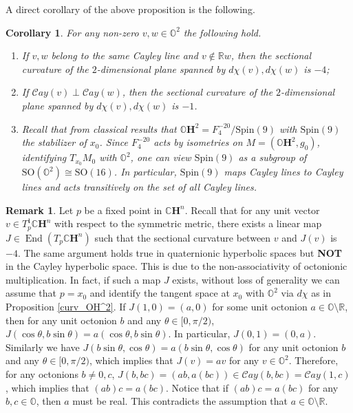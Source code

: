 \documentclass{article}
\newcommand{\isom}{\cong} %
\DeclareMathOperator{\End}{End}
\newcommand{\SO}{\mathrm{SO}}
\newcommand{\Spin}{\mathrm{Spin}}
\newcommand{\CC}{\mathbb{C}}
\newcommand{\OO}{\mathbb{O}}
\newcommand{\RR}{\mathbb{R}}
\newcommand{\Cay}{\mathcal{C}ay}
\newtheorem{cor}[thm]{Corollary}
\theoremstyle{definition}
\newtheorem*{rmk}{Remark}
\begin{document}
A direct corollary of the above proposition is the following.
\begin{cor}\label{curv_data_OH^2}
For any non-zero $v,w\in \OO^2$ the following hold.
\begin{enumerate}
\item[(1).] If $v,w$ belong to the same Cayley line and $v\not\in\RR w$, then the sectional curvature of the $2$-dimensional plane spanned by $d\chi(v),d\chi(w)$ is $-4$;
\item[(2).] If $\Cay(v)\perp\Cay(w)$, then the sectional curvature of the $2$-dimensional plane spanned by $d\chi(v),d\chi(w)$ is $-1$.
\item[(3).] Recall that from classical results that $\OO\mathbf{H}^2=F_4^{-20}/\Spin(9)$ with $\Spin(9)$ the stabilizer of $x_0$. Since $F_4^{-20}$ acts by isometries on $M=(\OO\mathbf{H}^2,g_0)$, identifying $T_{x_0}M_0$ with $\OO^2$, one can view $\Spin(9)$ as a subgroup of $\SO(\OO^2)\isom\SO(16)$. In particular, $\Spin(9)$ maps Cayley lines to Cayley lines and acts transitively on the set of all Cayley lines.  
\end{enumerate}
\end{cor}
\begin{rmk}
Let $p$ be a fixed point in $\CC\mathbf{H}^n$. Recall that for any unit vector $v\in T^1_p\CC\mathbf{H}^n$ with respect to the symmetric metric, there exists a linear map $J\in\End(T_p\CC\mathbf{H}^n)$ such that the sectional curvature between $v$ and $J(v)$ is $-4$. The same argument holds true in quaternionic hyperbolic spaces but \textbf{NOT} in the Cayley hyperbolic space. This is due to the non-associativity of octonionic multiplication. In fact, if such a map $J$ exists, without loss of generality we can assume that $p=x_0$ and identify the tangent space at $x_0$ with $\OO^2$ via $d\chi$ as in Proposition \ref{curv_OH^2}. If $J(1,0)=(a,0)$ for some unit octonion $a\in\OO\setminus \RR$, then for any unit octonion $b$ and any $\theta\in[0,\pi/2)$, $J(\cos\theta,b\sin\theta)=a(\cos\theta,b\sin\theta)$. In particular, $J(0,1)=(0,a)$. Similarly we have $J(b\sin\theta,\cos\theta)=a(b\sin\theta,\cos\theta)$ for any unit octonion $b$ and any $\theta\in[0,\pi/2)$, which implies that $J(v)=av$ for any $v\in\OO^2$. Therefore, for any octonions $b\neq 0,c$, $J(b,bc)=(ab,a(bc))\in\Cay(b,bc)=\Cay(1,c)$, which implies that $(ab)c=a(bc)$. Notice that if $(ab)c=a(bc)$ for any $b,c\in\OO$, then $a$ must be real. This contradicts the assumption that $a\in\OO\setminus\RR$.
\end{rmk}
\end{document}
